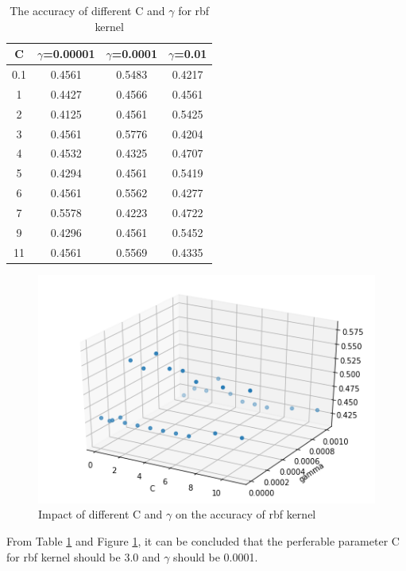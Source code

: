 \begin{table}[h!]
\centering
\begin{tabular}{||c| c | c | c||} 
 \hline
 \textbf{C} & \textbf{$\gamma$=0.00001} & \textbf{$\gamma$=0.0001} & \textbf{$\gamma$=0.01} \\ [0.5ex] 
 \hline\hline
0.1 & 0.4561 & 0.5483 & 0.4217\\\hline 
1 & 0.4427 & 0.4566 & 0.4561\\\hline 
2 & 0.4125 & 0.4561 & 0.5425\\\hline 
3 & 0.4561 & 0.5776 & 0.4204\\\hline 
4 & 0.4532 & 0.4325 & 0.4707\\\hline 
5 & 0.4294 & 0.4561 & 0.5419\\\hline 
6 & 0.4561 & 0.5562 & 0.4277\\\hline 
7 & 0.5578 & 0.4223 & 0.4722\\\hline 
9 & 0.4296 & 0.4561 & 0.5452\\\hline 
11 & 0.4561 & 0.5569 & 0.4335\\[1ex] 
 \hline
\end{tabular}
\caption{The accuracy of different C and $\gamma$ for rbf kernel}
\label{table:The accuracy of different C and gamma for rbf kernel}
\end{table}

\begin{figure}[h!]
    \centering
    \includegraphics[scale=0.5]{figures/Impact of different C and gamma on the accuracy of rbf kernel.png}
    \caption{Impact of different C and $\gamma$ on the accuracy of rbf kernel}
    \label{Impact of different C and gamma on the accuracy of rbf kernel}
\end{figure}

From Table \ref{table:The accuracy of different C and gamma for rbf kernel} and Figure \ref{Impact of different C and gamma on the accuracy of rbf kernel}, it can be concluded that the perferable parameter C for rbf kernel should be 3.0 and $\gamma$ should be 0.0001. 